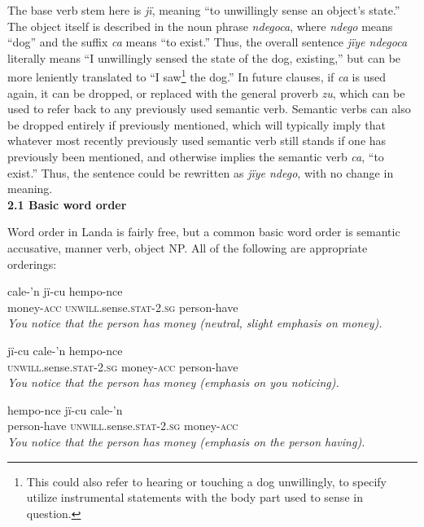 \documentclass{article}[10pt]
\begin{document}
The base verb stem here is \emph{j\"{i}}, meaning ``to unwillingly sense an object's state.'' The object itself is described in the noun phrase \emph{ndegoca}, where \emph{ndego} means ``dog'' and the suffix \emph{ca} means ``to exist.'' Thus, the overall sentence \emph{j\"{i}ye ndegoca} literally means ``I unwillingly sensed the state of the dog, existing,'' but can be more leniently translated to ``I saw\footnote{This could also refer to hearing or touching a dog unwillingly, to specify utilize instrumental statements with the body part used to sense in question.} the dog.'' In future clauses, if \emph{ca} is used again, it can be dropped, or replaced with the general proverb \emph{zu}, which can be used to refer back to any previously used semantic verb. Semantic verbs can also be dropped entirely if previously mentioned, which will typically imply that whatever most recently previously used semantic verb still stands if one has previously been mentioned, and otherwise implies the semantic verb \emph{ca}, ``to exist.'' Thus, the sentence could be rewritten as \emph{j\"{i}ye ndego}, with no change in meaning.\\

{\bf 2.1 Basic word order}

Word order in Landa is fairly free, but a common basic word order is semantic accusative, manner verb, object NP. All of the following are appropriate orderings:

\begin{exe}
\ex
\gll cale-'n j\"{i}-cu hempo-nce\\
money-\textsc{acc} \textsc{unwill}.sense.\textsc{stat}-2.\textsc{sg} person-have\\
\trans \emph{You notice that the person has money (neutral, slight emphasis on money).}

\ex
\gll j\"{i}-cu cale-'n hempo-nce\\
\textsc{unwill}.sense.\textsc{stat}-2.\textsc{sg} money-\textsc{acc} person-have\\
\trans \emph{You notice that the person has money (emphasis on you noticing).}

\ex
\gll hempo-nce j\"{i}-cu cale-'n\\
 person-have \textsc{unwill}.sense.\textsc{stat}-2.\textsc{sg} money-\textsc{acc} \\
\trans \emph{You notice that the person has money (emphasis on the person having).}
\end{exe}
\end{document}
